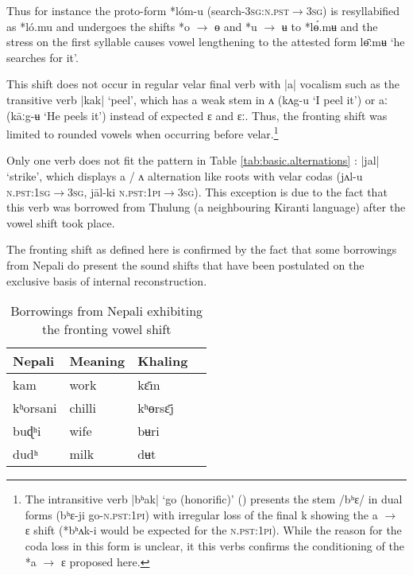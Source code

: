 \documentclass[oldfontcommands,oneside,a4paper,11pt]{article}
\newcommand{\ipa}[1]{{\phon \mbox{#1}}} %
\begin{document}
Thus for instance  the proto-form \ipa{*lóm-u} (search-\textsc{3sg:n.pst$\rightarrow$3sg}) is resyllabified as \ipa{*ló.mu} and undergoes the shifts \ipa{*o} $\rightarrow$ \ipa{ɵ} and \ipa{*u} $\rightarrow$ \ipa{ʉ} to  \ipa{*lɵ́.mʉ} and the stress on the first syllable causes vowel lengthening to the attested form \ipa{lɵ̄ːmʉ} `he searches for it'.

This shift does not occur in regular velar final verb with |a| vocalism such as the transitive verb |kak| `peel', which has a weak stem in \ipa{ʌ} (\ipa{kʌg-u} `I peel it') or \ipa{aː}  (\ipa{kāːg-ʉ} `He peels it') instead of expected \ipa{ɛ} and \ipa{ɛː}.  Thus, the fronting shift was limited to rounded vowels when occurring before velar.\footnote{The intransitive   verb |\ipa{bʰak}| `go (honorific)' (\citealt[1115]{jacques12khaling}) presents the stem  /\ipa{bʰɛ}/ in dual forms (\ipa{bʰɛ-ji} go-\textsc{n.pst:1pi}) with irregular loss of  the final \ipa{k} showing the \ipa{a} $\rightarrow$ \ipa{ɛ} shift (\ipa{*bʰʌk-i} would be expected for the \textsc{n.pst:1pi}). While the reason for the coda loss in this form is unclear, it this verbs confirms the conditioning of the \ipa{*a} $\rightarrow$ \ipa{ɛ} proposed here.}

 Only one verb  does not fit the pattern in Table \ref{tab:basic.alternations} :  |\ipa{jal}|  `strike', which displays \ipa{a} / \ipa{ʌ} alternation like roots with velar codas (\ipa{jʌl-u} \textsc{n.pst:1sg$\rightarrow$3sg}, \ipa{ja‍̄l-ki} \textsc{n.pst:1pi$\rightarrow$3sg}). This exception is due to the fact that this verb was borrowed from Thulung (a neighbouring Kiranti language) after the vowel shift took place.

The fronting shift as defined here is confirmed   by the fact that some borrowings from Nepali do present the sound shifts that have been postulated on the exclusive basis of internal reconstruction.

\begin{table}
\caption{Borrowings from Nepali exhibiting the fronting vowel shift} \label{tab:nep.fronting} \centering
\begin{tabular}{llll}
\toprule
Nepali & Meaning & Khaling \\
\midrule
\ipa{kam} & work & \ipa{kɛ̄m} \\
\ipa{kʰorsani} & chilli&\ipa{kʰɵrsɛ̄j}\\
\ipa{buɖʰi} & wife&\ipa{bʉri}\\
\ipa{dudʰ} & milk&\ipa{dʉt}\\
\bottomrule
\end{tabular}
\end{table}
\end{document}
